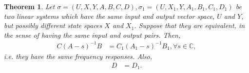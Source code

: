 \documentclass[12pt]{book}
\theoremstyle{plain}
\newtheorem{theorem}{Theorem}[section]
\theoremstyle{definition}
\begin{document}
\begin{theorem} \label{thm:Equivalence1}
    Let $\sigma = (U, X, Y, A, B, C, D), \sigma_1 = (U, X_1, Y, A_1, B_1, C_1, D_1)$ be two linear systems which have the same input and output vector space, $U$ and $Y$, but possibly different state spaces $X$ and $X_1$.
    Suppose that they are equivalent, in the sense of having the same input and output pairs.
    Then,
    \begin{align}
        C(A-s)^{-1}B &= C_1(A_1-s)^{-1}B_1, \forall s \in \mathbb{C},
    \end{align}
    i.e. they have the same frequency responses.
    Also,
    \begin{align}
        D &= D_1.
    \end{align}
\end{theorem}
\end{document}
